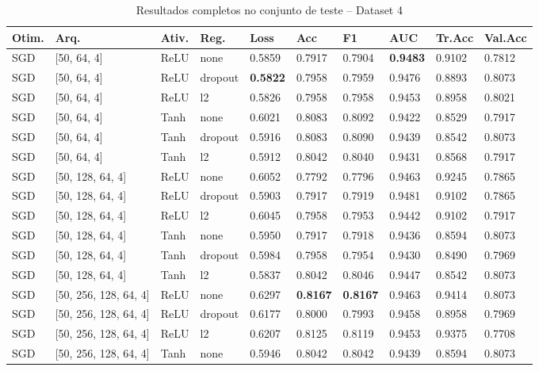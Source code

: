 \documentclass[12pt,a4paper]{article}
\begin{document}
\begin{table}[h]
\centering
\caption{Resultados completos no conjunto de teste -- Dataset 4}
\label{tab:full_results}
\scriptsize
\setlength{\tabcolsep}{4pt}
\begin{tabular}{llllllllll}
\toprule
\textbf{Otim.} & \textbf{Arq.} & \textbf{Ativ.} & \textbf{Reg.} &
\textbf{Loss} & \textbf{Acc} & \textbf{F1} & \textbf{AUC} &
\textbf{Tr.Acc} & \textbf{Val.Acc} \\
\midrule
SGD & [50, 64, 4] & ReLU & none & 0.5859 & 0.7917 & 0.7904 & \textbf{0.9483} & 0.9102 & 0.7812 \\
SGD & [50, 64, 4] & ReLU & dropout & \textbf{0.5822} & 0.7958 & 0.7959 & 0.9476 & 0.8893 & 0.8073 \\
SGD & [50, 64, 4] & ReLU & l2 & 0.5826 & 0.7958 & 0.7958 & 0.9453 & 0.8958 & 0.8021 \\
SGD & [50, 64, 4] & Tanh & none & 0.6021 & 0.8083 & 0.8092 & 0.9422 & 0.8529 & 0.7917 \\
SGD & [50, 64, 4] & Tanh & dropout & 0.5916 & 0.8083 & 0.8090 & 0.9439 & 0.8542 & 0.8073 \\
SGD & [50, 64, 4] & Tanh & l2 & 0.5912 & 0.8042 & 0.8040 & 0.9431 & 0.8568 & 0.7917 \\
SGD & [50, 128, 64, 4] & ReLU & none & 0.6052 & 0.7792 & 0.7796 & 0.9463 & 0.9245 & 0.7865 \\
SGD & [50, 128, 64, 4] & ReLU & dropout & 0.5903 & 0.7917 & 0.7919 & 0.9481 & 0.9102 & 0.7865 \\
SGD & [50, 128, 64, 4] & ReLU & l2 & 0.6045 & 0.7958 & 0.7953 & 0.9442 & 0.9102 & 0.7917 \\
SGD & [50, 128, 64, 4] & Tanh & none & 0.5950 & 0.7917 & 0.7918 & 0.9436 & 0.8594 & 0.8073 \\
SGD & [50, 128, 64, 4] & Tanh & dropout & 0.5984 & 0.7958 & 0.7954 & 0.9430 & 0.8490 & 0.7969 \\
SGD & [50, 128, 64, 4] & Tanh & l2 & 0.5837 & 0.8042 & 0.8046 & 0.9447 & 0.8542 & 0.8073 \\
SGD & [50, 256, 128, 64, 4] & ReLU & none & 0.6297 & \textbf{0.8167} & \textbf{0.8167} & 0.9463 & 0.9414 & 0.8073 \\
SGD & [50, 256, 128, 64, 4] & ReLU & dropout & 0.6177 & 0.8000 & 0.7993 & 0.9458 & 0.8958 & 0.7969 \\
SGD & [50, 256, 128, 64, 4] & ReLU & l2 & 0.6207 & 0.8125 & 0.8119 & 0.9453 & 0.9375 & 0.7708 \\
SGD & [50, 256, 128, 64, 4] & Tanh & none & 0.5946 & 0.8042 & 0.8042 & 0.9439 & 0.8594 & 0.8073 \\

\end{tabular}
\end{table}
\end{document}
